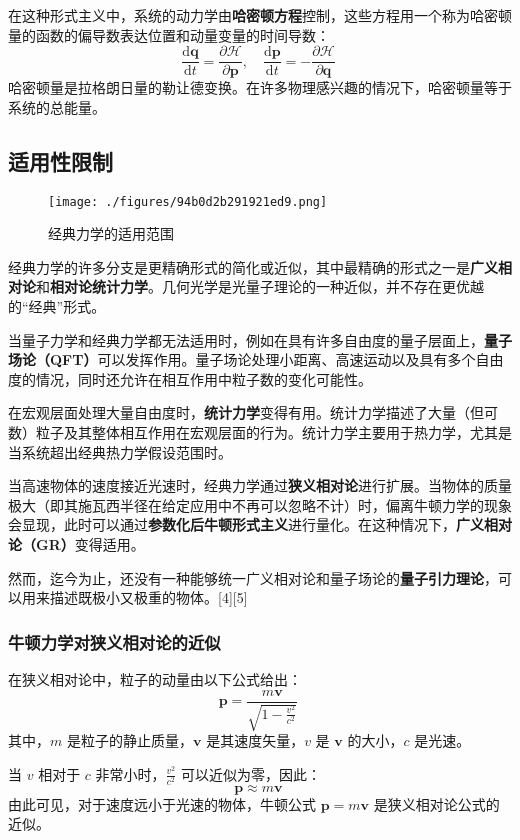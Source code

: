在这种形式主义中，系统的动力学由\textbf{哈密顿方程}控制，这些方程用一个称为哈密顿量的函数的偏导数表达位置和动量变量的时间导数：  
\[
\frac{\mathrm{d} \boldsymbol{q}}{\mathrm{d} t} = \frac{\partial \mathcal{H}}{\partial \boldsymbol{p}}, \quad \frac{\mathrm{d} \boldsymbol{p}}{\mathrm{d} t} = -\frac{\partial \mathcal{H}}{\partial \boldsymbol{q}}~
\]  
哈密顿量是拉格朗日量的勒让德变换。在许多物理感兴趣的情况下，哈密顿量等于系统的总能量。
\subsection{适用性限制}
\begin{figure}[ht]
\centering
\texttt{[image: ./figures/94b0d2b291921ed9.png]}
\caption{经典力学的适用范围} \label{fig_JDLX_3}
\end{figure}  
经典力学的许多分支是更精确形式的简化或近似，其中最精确的形式之一是\textbf{广义相对论}和\textbf{相对论统计力学}。几何光学是光量子理论的一种近似，并不存在更优越的“经典”形式。  

当量子力学和经典力学都无法适用时，例如在具有许多自由度的量子层面上，\textbf{量子场论（QFT）}可以发挥作用。量子场论处理小距离、高速运动以及具有多个自由度的情况，同时还允许在相互作用中粒子数的变化可能性。  

在宏观层面处理大量自由度时，\textbf{统计力学}变得有用。统计力学描述了大量（但可数）粒子及其整体相互作用在宏观层面的行为。统计力学主要用于热力学，尤其是当系统超出经典热力学假设范围时。  

当高速物体的速度接近光速时，经典力学通过\textbf{狭义相对论}进行扩展。当物体的质量极大（即其施瓦西半径在给定应用中不再可以忽略不计）时，偏离牛顿力学的现象会显现，此时可以通过\textbf{参数化后牛顿形式主义}进行量化。在这种情况下，\textbf{广义相对论（GR）}变得适用。  

然而，迄今为止，还没有一种能够统一广义相对论和量子场论的\textbf{量子引力理论}，可以用来描述既极小又极重的物体。[4][5]
\subsubsection{牛顿力学对狭义相对论的近似} 
在狭义相对论中，粒子的动量由以下公式给出：  
\[
\mathbf{p} = \frac{m\mathbf{v}}{\sqrt{1 - \frac{v^2}{c^2}}}~
\]  
其中，\( m \) 是粒子的静止质量，\( \mathbf{v} \) 是其速度矢量，\( v \) 是 \( \mathbf{v} \) 的大小，\( c \) 是光速。  

当 \( v \) 相对于 \( c \) 非常小时，\( \frac{v^2}{c^2} \) 可以近似为零，因此：  
\[
\mathbf{p} \approx m\mathbf{v}~
\]  
由此可见，对于速度远小于光速的物体，牛顿公式 \( \mathbf{p} = m\mathbf{v} \) 是狭义相对论公式的近似。  

